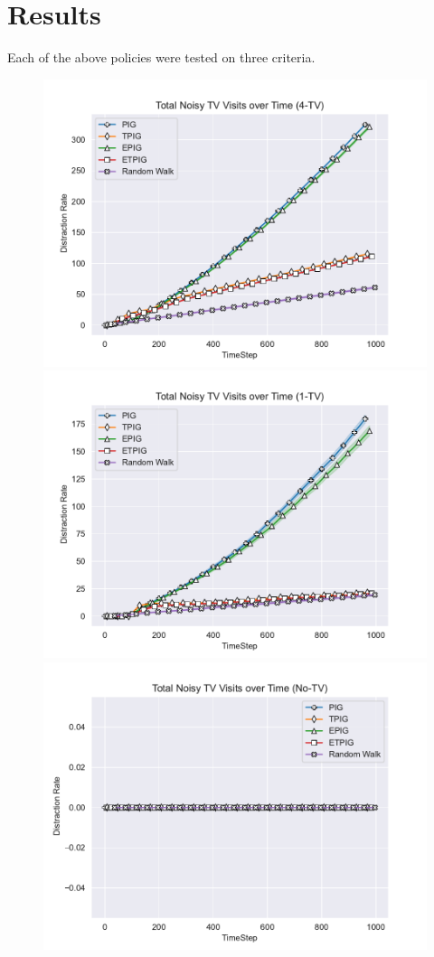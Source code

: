 \documentclass[12pt]{thesis}
\begin{document}
\chapter{Results}
Each of the above policies were tested on three criteria.
\begin{figure}
	\begin{center}
		\includegraphics[scale=0.7]{"images/Distraction_Rate_4-TV.pdf"}
		\includegraphics[scale=0.7]{"images/Distraction_Rate_1-TV.pdf"}
		\includegraphics[scale=0.7]{"images/Distraction_Rate_No-TV.pdf"}

\end{center}
\end{figure}
\end{document}
